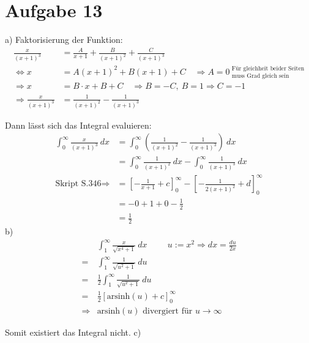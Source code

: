 \documentclass[10pt]{article}
\newcommand{\arsinh}{\text{arsinh}}
\begin{document}
\thispagestyle{fancy}
\section*{Aufgabe 13}
a)
Faktorisierung der Funktion:
\begin{align*}
	\frac{x}{(x+1)^3} &=
	\frac{A}{x+1} + \frac{B}{(x+1)^2} + \frac{C}{(x+1)^3} \\
	\Leftrightarrow
	x &= 
	A (x+1)^2 + B (x+1) + C 
	\quad \Rightarrow
	A=0 \ 
	^\text{Für gleichheit beider Seiten}
	_\text{muss Grad gleich sein} \\
	\Rightarrow x &=
	B \cdot x + B + C
	\quad \Rightarrow B = -C, \ B = 1 \Rightarrow C = -1 \\
	\Rightarrow
	\frac{x}{(x+1)^3} &=
	\frac{1}{(x+1)^2} - \frac{1}{(x+1)^3}
\end{align*}

Dann lässt sich das Integral evaluieren:
\begin{align*}
	\int_0^\infty \frac{x}{(x+1)^3} \ dx
	&= 
	\int_0^\infty \left( 
	\frac{1}{(x+1)^2} - \frac{1}{(x+1)^3}
	\right)
	\ dx \\
	&= 
	\int_0^\infty \frac{1}{(x+1)^2} \ dx -
	\int_0^\infty \frac{1}{(x+1)^3} \ dx \\
	\text{Skript S.346} \Rightarrow
	&=
	\left[ -\frac{1}{x+1} + c\right]_0^\infty
	-
	\left[ -\frac1{2 (x+1)^2} + d \right]_0^\infty \\
	&= -0 + 1 + 0 - \frac12 \\
	&= \frac12
\end{align*}
b)
\begin{align*}
	&\int_1^\infty \frac{x}{\sqrt{x^4 + 1}} \ dx 
	\hspace{1cm} u:= x^2 \Rightarrow dx = \frac{du}{2x} \\
	= &\int_1^\infty \frac{1}{\sqrt{u^2 + 1}} \ du \\
	= &\frac12 \int_1^\infty \frac{1}{\sqrt{u^2 + 1}} \ du \\
	= &\frac12 \left[\arsinh(u) + c \right]_0^\infty \\
	\Rightarrow & \arsinh(u) \text{ divergiert für } u \rightarrow
	\infty
\end{align*}

Somit existiert das Integral nicht.\newline
\vspace{0.2cm}
\newline
c)
\end{document}
